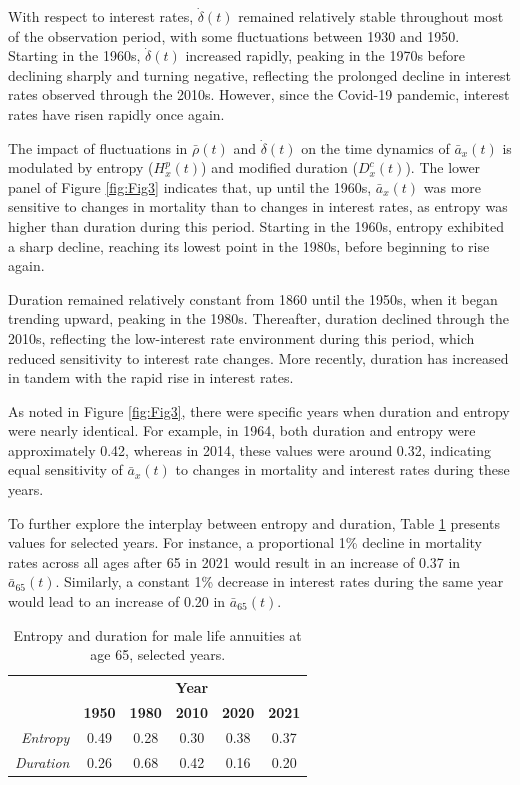 \documentclass[12pt]{article}
\begin{document}
With respect to interest rates, \( \dot{\delta}(t) \) remained relatively stable throughout most of the observation period, with some fluctuations between 1930 and 1950. Starting in the 1960s, \( \dot{\delta}(t) \) increased rapidly, peaking in the 1970s before declining sharply and turning negative, reflecting the prolonged decline in interest rates observed through the 2010s. However, since the Covid-19 pandemic, interest rates have risen rapidly once again.


The impact of fluctuations in \( \bar{\rho}(t) \) and \( \dot{\delta}(t) \) on the time dynamics of \( \bar{a}_x(t) \) is modulated by entropy (\( {H}^{p}_x(t) \)) and modified duration (\( {D}^{c}_x(t) \)). The lower panel of Figure \ref{fig:Fig3} indicates that, up until the 1960s, \( \bar{a}_x(t) \) was more sensitive to changes in mortality than to changes in interest rates, as entropy was higher than duration during this period. Starting in the 1960s, entropy exhibited a sharp decline, reaching its lowest point in the 1980s, before beginning to rise again.

Duration remained relatively constant from 1860 until the 1950s, when it began trending upward, peaking in the 1980s. Thereafter, duration declined through the 2010s, reflecting the low-interest rate environment during this period, which reduced sensitivity to interest rate changes. More recently, duration has increased in tandem with the rapid rise in interest rates.

As noted in Figure \ref{fig:Fig3}, there were specific years when duration and entropy were nearly identical. For example, in 1964, both duration and entropy were approximately 0.42, whereas in 2014, these values were around 0.32, indicating equal sensitivity of \( \bar{a}_x(t) \) to changes in mortality and interest rates during these years.

To further explore the interplay between entropy and duration, Table \ref{tab:entropyDuration} presents values for selected years. For instance, a proportional 1\% decline in mortality rates across all ages after 65 in 2021 would result in an increase of 0.37 in \( \bar{a}_{65}(t) \). Similarly, a constant 1\% decrease in interest rates during the same year would lead to an increase of 0.20 in \( \bar{a}_{65}(t) \).



\begin{table}[ht]
	\begin{tabular}{rccccc}
		\toprule
		& \multicolumn{5}{c}{\textbf{Year}}  \\

		& \textbf{1950} & \textbf{1980} & \textbf{2010 }& \textbf{2020} & \textbf{2021} \\
\hline
	\textit{Entropy} &  0.49    & 0.28     & 0.30     &   0.38 & 0.37  \\
	
		\textit{Duration} &  0.26    & 0.68     &  0.42    &     0.16 & 0.20\\
\bottomrule
	\end{tabular}
	 \caption{ Entropy and duration for male life annuities at age 65, selected years.}
	\label{tab:entropyDuration}   
\end{table}
\end{document}
